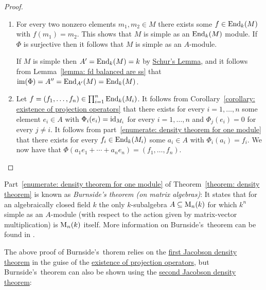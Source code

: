\begin{proof}
  \leavevmode
  \begin{enumerate}
    \item
      For every two nonzero elements $m_1, m_2 \in M$ there exists some $f \in \operatorname{End}_k(M)$ with $f(m_1) = m_2$.
      This shows that $M$ is simple as an $\operatorname{End}_k(M)$ module.
      If $\Phi$ is surjective then it follows that $M$ is simple as an $A$-module.
      
      If $M$ is simple then $A' = \operatorname{End}_k(M) = k$ by \hyperref[proposition: schurs lemma for modules]{Schur’s Lemma}, and it follows from Lemma~\ref{lemma: fd balanced are ss} that $\operatorname{im}(\Phi) = A'' = \operatorname{End}_{A'}(M) = \operatorname{End}_k(M)$.
    \item
      Let $f = (f_1, \dotsc, f_n) \in \prod_{i=1}^n \operatorname{End}_k(M_i)$.
      It follows from Corollary~\ref{corollary: existence of projection operators} that there exists for every $i = 1, \dotsc, n$ some element $e_i \in A$ with $\Phi_i(e_i) = \operatorname{id}_{M_i}$ for every $i = 1, \dotsc, n$ and $\Phi_j(e_i) = 0$ for every $j \neq i$.
      It follows from part~\ref*{enumerate: density theorem for one module} that there exists for every $f_i \in \operatorname{End}_k(M_i)$ some $a_i \in A$ with $\Phi_i(a_i) = f_i$.
      We now have that $\Phi(a_1 e_1 + \dotsb + a_n e_n) = (f_1, \dotsc, f_n)$.
    \qedhere
  \end{enumerate}
\end{proof}





\begin{remark}
  Part~\ref*{enumerate: density theorem for one module} of Theorem~\ref{theorem: density theorem} is known as \emph{Burnside’s theorem \textup(on matrix algebras\textup)}:
  It states that for an algebraically closed field $k$ the only $k$-subalgebra $A \subseteq \operatorname{M}_n(k)$ for which $k^n$ simple as an $A$-module (with respect to the action given by matrix-vector multiplication) is $\operatorname{M}_n(k)$ itself.
  More information on Burnside’s~theorem can be found in \cite{ShapiroBurnside}.
  
  The above proof of Burnside’s~thorem  relies on the \hyperref[theorem: first jacobson density theorem]{first Jacobson density theorem} in the guise of the \hyperref[corollary: existence of projection operators]{existence of projection operators}, but Burnside’s~theorem can also be shown using the \hyperref[theorem: second jacobson density theorem]{second Jacobson density theorem}:
\end{remark}


